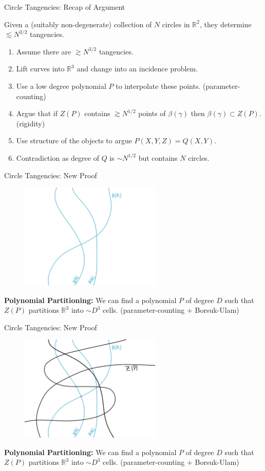 \documentclass{beamer}
\newcommand{\RR}{\mathbb R}
\newcommand{\nfr}[1]{\begin{frame} #1
\end{frame}}
\begin{document}
\nfr{{Circle Tangencies: Recap of Argument}
\begin{theorem}
    Given a (suitably non-degenerate) collection of $N$ circles in $\RR^2$, they determine $\lesssim N^{3/2}$ tangencies.
\end{theorem}
\begin{enumerate}
    \item Assume there are $\gtrsim N^{3/2}$ tangencies.
    \item Lift curves into $\RR^3$ and change into an incidence problem.
    \item Use a low degree polynomial $P$ to interpolate these points. (parameter-counting)
    \item Argue that if $Z(P)$ contains $\gtrsim N^{1/2}$ points of $\beta(\gamma)$ then $\beta(\gamma) \subset Z(P)$. (rigidity)
    \item Use structure of the objects to argue $P(X,Y,Z) = Q(X,Y)$.
    \item Contradiction as degree of $Q$ is $\sim N^{1/2}$ but contains $N$ circles.
\end{enumerate}
}

\nfr{{Circle Tangencies: New Proof }
\begin{figure}[h]
    \centering
    \includegraphics[width=0.6\textwidth]{images/new_proof_a.png}
\end{figure}
\textbf{Polynomial Partitioning:} We can find a polynomial $P$ of degree $D$ such that $Z(P)$ partitions $\RR^3$ into $\sim D^3$ cells. (parameter-counting + Borsuk-Ulam)
}


\nfr{{Circle Tangencies: New Proof }
\begin{figure}[h]
    \centering
    \includegraphics[width=0.6\textwidth]{images/new_proof_b.png}
\end{figure}
\textbf{Polynomial Partitioning:} We can find a polynomial $P$ of degree $D$ such that $Z(P)$ partitions $\RR^3$ into $\sim D^3$ cells. (parameter-counting + Borsuk-Ulam)
}
\end{document}

